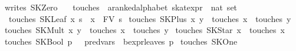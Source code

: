 \begin{isabellebody}
{}\ {}writes\ SKZero\ {}\ {}{}{}\isanewline
\isanewline
{}\isamarkupfalse%
\ touches\ {}{}\ {}{}a{}{}ranked{}alphabet\ skat{}expr\ {}\ nat\ set{}\ \isanewline
\ \ {}touches\ {}SKLeaf\ x\ s{}\ {}\ {}x{}\ {}\ FV\ s{}\isanewline
{}\ {}touches\ {}SKPlus\ x\ y{}\ {}\ touches\ x\ {}\ touches\ y{}\isanewline
{}\ {}touches\ {}SKMult\ x\ y{}\ {}\ touches\ x\ {}\ touches\ y{}\isanewline
{}\ {}touches\ {}SKStar\ x{}\ {}\ touches\ x{}\isanewline
{}\ {}touches\ {}SKBool\ p{}\ {}\ {}\ {}pred{}vars\ {}\ bexpr{}leaves\ p{}{}\isanewline
{}\ {}touches\ SKOne\ {}\ {}{}{}\isanewline

\end{isabellebody}
